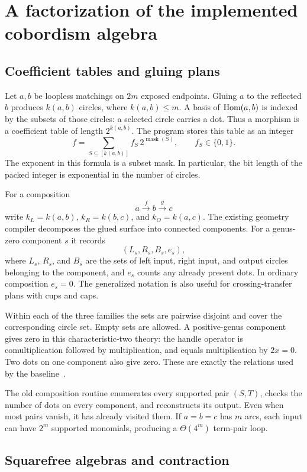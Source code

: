 \section{A factorization of the implemented cobordism algebra}
\label{sec:algebra}

\subsection{Coefficient tables and gluing plans}

Let $a,b$ be loopless matchings on $2m$ exposed endpoints. Gluing $a$ to
the reflected $b$ produces $k(a,b)$ circles, where $k(a,b)\leq m$. A basis
of $\operatorname{Hom}(a,b)$ is indexed by the subsets of those circles: a selected circle
carries a dot. Thus a morphism is a coefficient table of length
$2^{k(a,b)}$. The program stores this table as an integer
\[
 f=\sum_{S\subseteq[k(a,b)]} f_S\,2^{\operatorname{mask}(S)},
 \qquad f_S\in\{0,1\}.
\]
The exponent in this formula is a subset mask. In particular, the bit
length of the packed integer is exponential in the number of circles.

For a composition
\[
 a\xrightarrow{f}b\xrightarrow{g}c
\]
write $k_L=k(a,b)$, $k_R=k(b,c)$, and $k_O=k(a,c)$. The existing geometry
compiler decomposes the glued surface into connected components. For a
genus-zero component $s$ it records
\[
 (L_s,R_s,B_s,e_s),
\]
where $L_s$, $R_s$, and $B_s$ are the sets of left input, right input, and
output circles belonging to the component, and $e_s$ counts any already
present dots. In ordinary composition $e_s=0$. The generalized notation is
also useful for crossing-transfer plans with cups and caps.

Within each of the three families the sets are pairwise disjoint and cover
the corresponding circle set. Empty sets are allowed. A positive-genus
component gives zero in this characteristic-two theory: the handle
operator is comultiplication followed by multiplication, and equals
multiplication by $2x=0$. Two dots on one component also give zero. These
are exactly the relations used by the baseline~\cite{barnatan,proveit}.

The old composition routine enumerates every supported pair $(S,T)$,
checks the number of dots on every component, and reconstructs its output.
Even when most pairs vanish, it has already visited them. If $a=b=c$ has
$m$ arcs, each input can have $2^m$ supported monomials, producing a
$\Theta(4^m)$ term-pair loop.

\subsection{Squarefree algebras and contraction}

